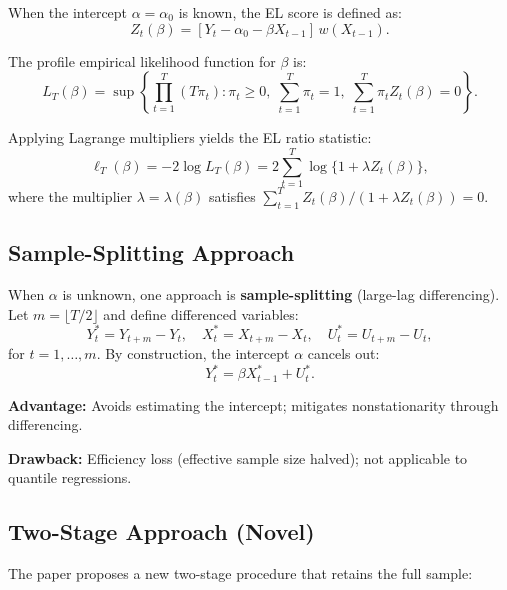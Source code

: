 \documentclass[11pt,a4paper]{article}
\theoremstyle{definition}
\theoremstyle{remark}
\begin{document}
When the intercept $\alpha = \alpha_0$ is known, the EL score is defined as:
\begin{equation}
    Z_t(\beta) = [Y_t - \alpha_0 - \beta X_{t-1}]\, w(X_{t-1}).
\end{equation}

The profile empirical likelihood function for $\beta$ is:
\begin{equation}
    L_T(\beta) = \sup\left\{
        \prod_{t=1}^T (T\pi_t) : \pi_t \geq 0,\; \sum_{t=1}^T \pi_t = 1,\;
        \sum_{t=1}^T \pi_t Z_t(\beta) = 0
    \right\}.
\end{equation}

Applying Lagrange multipliers yields the EL ratio statistic:
\begin{equation}
    \ell_T(\beta) = -2\log L_T(\beta) = 2\sum_{t=1}^T \log\{1 + \lambda Z_t(\beta)\},
\end{equation}
where the multiplier $\lambda = \lambda(\beta)$ satisfies
$\sum_{t=1}^T Z_t(\beta) / (1 + \lambda Z_t(\beta)) = 0$.

\subsection{Sample-Splitting Approach}

When $\alpha$ is unknown, one approach is \textbf{sample-splitting} (large-lag differencing).
Let $m = \lfloor T/2 \rfloor$ and define differenced variables:
\begin{equation}
    Y_t^* = Y_{t+m} - Y_t, \quad X_t^* = X_{t+m} - X_t, \quad U_t^* = U_{t+m} - U_t,
\end{equation}
for $t = 1, \ldots, m$. By construction, the intercept $\alpha$ cancels out:
\begin{equation}
    Y_t^* = \beta X_{t-1}^* + U_t^*.
\end{equation}

\smallskip
\noindent\textbf{Advantage:} Avoids estimating the intercept; mitigates nonstationarity through differencing.

\noindent\textbf{Drawback:} Efficiency loss (effective sample size halved);
not applicable to quantile regressions.

\subsection{Two-Stage Approach (Novel)}

The paper proposes a new two-stage procedure that retains the full sample:
\end{document}
